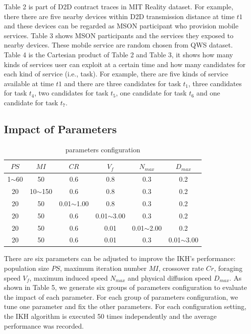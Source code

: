 \documentclass[10pt,journal,compsoc]{IEEEtran}
\begin{document}
Table 2 is part of D2D contract traces in MIT Reality dataset. For example, there there are five nearby devices within D2D transmission distance at time $t1$ and these devices can be regarded as MSON participant who provision mobile services. Table 3 shows MSON participants and the services they exposed to nearby devices. These mobile service are random chosen from QWS dataset. Table 4 is the Cartesian product of Table 2 and Table 3, it shows how many kinds of services user can exploit at a certain time and how many candidates for each kind of service (i.e., task). For example, there are five kinds of service available at time $t1$ and there are three candidates for task $t_1$, three candidates for task $t_4$, two candidates for task $t_5$, one candidate for task $t_6$ and one candidate for task $t_7$.

\subsection{Impact of Parameters}

\begin{table}[!t]
\renewcommand{\arraystretch}{1.3}
\caption{parameters configuration}
\label{table_example}
\centering
\begin{tabular}{cccccc}
\hline
\bfseries $PS$ & \bfseries $MI$ & \bfseries $CR$ & \bfseries $V_f$ & \bfseries $N_{max}$ & \bfseries $D_{max}$ \\
\hline
1$\sim$60 & 50          & 0.6            & 0.8            &  0.3            &  0.2 \\
20        & 10$\sim$150 & 0.6            & 0.8            &  0.3            &  0.2 \\
20        & 50          & 0.01$\sim$1.00 & 0.8            &  0.3            &  0.2 \\
20        & 50          & 0.6            & 0.01$\sim$3.00 &  0.3            &  0.2 \\
20        & 50          & 0.6            & 0.01           &  0.01$\sim$2.00 &  0.2 \\
20        & 50          & 0.6            & 0.01           &  0.3            &  0.01$\sim$3.00 \\
\hline
\end{tabular}
\end{table}

There are six parameters can be adjusted to improve the IKH's performance: population size $PS$, maximum iteration number $MI$, crossover rate $Cr$, foraging speed $V_f$, maximum induced speed $N_{max}$ and physical diffusion speed $D_{max}$. As shown in Table 5, we generate six groups of parameters configuration to evaluate the impact of each parameter. For each group of parameters configuration, we tune one parameter and fix the other parameters. For each configuration setting, the IKH algorithm is executed 50 times independently and the average performance was recorded.
\end{document}
